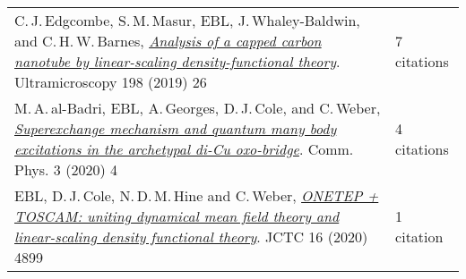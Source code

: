 \documentclass[10pt,a4paper,final]{article}
\begin{document}
\begin{tabularx}{\textwidth}{
      m{}%
      m{}}
   C.\,J.\,Edgcombe, S.\,M.\,Masur, EBL, J.\,Whaley-Baldwin, and C.\,H.\,W.\,Barnes, \href{https://www.sciencedirect.com/science/article/pii/S0304399118302833}{\textit{Analysis of a capped carbon nanotube by linear-scaling density-functional theory}}. Ultramicroscopy 198 (2019) 26                                                                                                                                                                                                                                                                                                                                                                                                                                                                     & 7 citations                                     \\
   M.\,A.\,al-Badri, EBL, A.\,Georges, D.\,J.\,Cole, and C.\,Weber, \href{https://www.nature.com/articles/s42005-019-0270-1}{\textit{Superexchange mechanism and quantum many body excitations in the archetypal di-Cu oxo-bridge}}. Comm. Phys. 3 (2020) 4                                                                                                                                                                                                                                                                                                                                                                                                                                                                                                   & 4 citations                                     \\
   EBL, D.\,J.\,Cole, N.\,D.\,M.\,Hine and C.\,Weber, \href{https://pubs.acs.org/doi/10.1021/acs.jctc.0c00162}{\textit{ONETEP + TOSCAM: uniting dynamical mean field theory and linear-scaling density functional theory}}. JCTC 16 (2020) 4899                                                                                                                                                                                                                                                                                                                                                                                                                                                                                                               & 1 citation                                      \\

\end{tabularx}
\end{document}
